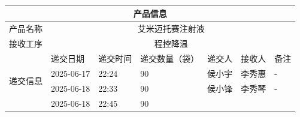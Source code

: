 \documentclass[UTF8,10pt,a4paper,fontset=fandol]{ctexart}
\renewcommand{\arraystretch}{1.15}
\newcommand{\fieldvalue}[1]{#1}
\newcommand{\handwritten}[1]{#1}
\begin{document}
\begin{center}
\small
\renewcommand{\arraystretch}{1.35}
\begin{tabular}{|p{1.7cm}|p{1.55cm}|p{1.45cm}|p{1.35cm}|p{1.55cm}|p{1.55cm}|p{1.1cm}|}
\hline
\multicolumn{7}{|c|}{产品信息}\\
\hline
产品名称 & \multicolumn{6}{c|}{艾米迈托赛注射液}\\
\hline
接收工序 & \multicolumn{6}{c|}{程控降温}\\
\hline
\multirow{7}{*}{递交信息}
& 递交日期 & 递交时间 & 递交数量（袋） & 递交人 & 接收人 & 备注\\
\cline{2-7}
&
\fieldvalue{\handwritten{2025-06-17}}
&
\fieldvalue{\handwritten{22:24}}
&
\fieldvalue{\handwritten{90}}
&
\fieldvalue{\handwritten{侯小宇}}
&
\fieldvalue{\handwritten{李秀惠}}
&
\fieldvalue{\handwritten{-}}
\\
\cline{2-7}
&
\fieldvalue{\handwritten{2025-06-18}}
&
\fieldvalue{\handwritten{22:33}}
&
\fieldvalue{\handwritten{90}}
&
\fieldvalue{\handwritten{侯小锋}}
&
\fieldvalue{\handwritten{李秀琴}}
&
\fieldvalue{\handwritten{-}}
\\
\cline{2-7}
&
\fieldvalue{\handwritten{2025-06-18}}
&
\fieldvalue{\handwritten{22:45}}
&
\fieldvalue{\handwritten{90}}

\end{tabular}
\end{center}
\end{document}
